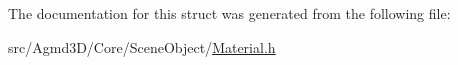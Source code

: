The documentation for this struct was generated from the following file\+:\begin{DoxyCompactItemize}
\item 
src/\+Agmd3\+D/\+Core/\+Scene\+Object/\hyperlink{_material_8h}{Material.\+h}\end{DoxyCompactItemize}
